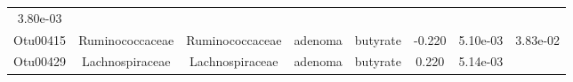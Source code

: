\documentclass[11pt,]{article}
\begin{document}
\begin{longtable}[]{@{}cccccccc@{}}
\begin{minipage}[t]{0.08\columnwidth}
3.80e-03\strut
\end{minipage}\tabularnewline
\begin{minipage}[t]{0.08\columnwidth}\centering\strut
Otu00415\strut
\end{minipage} & \begin{minipage}[t]{0.15\columnwidth}\centering\strut
Ruminococcaceae\strut
\end{minipage} & \begin{minipage}[t]{0.15\columnwidth}\centering\strut
Ruminococcaceae\strut
\end{minipage} & \begin{minipage}[t]{0.08\columnwidth}\centering\strut
adenoma\strut
\end{minipage} & \begin{minipage}[t]{0.09\columnwidth}\centering\strut
butyrate\strut
\end{minipage} & \begin{minipage}[t]{0.07\columnwidth}\centering\strut
-0.220\strut
\end{minipage} & \begin{minipage}[t]{0.08\columnwidth}\centering\strut
5.10e-03\strut
\end{minipage} & \begin{minipage}[t]{0.08\columnwidth}\centering\strut
3.83e-02\strut
\end{minipage}\tabularnewline
\begin{minipage}[t]{0.08\columnwidth}\centering\strut
Otu00429\strut
\end{minipage} & \begin{minipage}[t]{0.15\columnwidth}\centering\strut
Lachnospiraceae\strut
\end{minipage} & \begin{minipage}[t]{0.15\columnwidth}\centering\strut
Lachnospiraceae\strut
\end{minipage} & \begin{minipage}[t]{0.08\columnwidth}\centering\strut
adenoma\strut
\end{minipage} & \begin{minipage}[t]{0.09\columnwidth}\centering\strut
butyrate\strut
\end{minipage} & \begin{minipage}[t]{0.07\columnwidth}\centering\strut
0.220\strut
\end{minipage} & \begin{minipage}[t]{0.08\columnwidth}\centering\strut
5.14e-03\strut
\end{minipage} & \begin{minipage}[t]{0.08\columnwidth}\centering\strut

\end{minipage}
\end{longtable}
\end{document}
